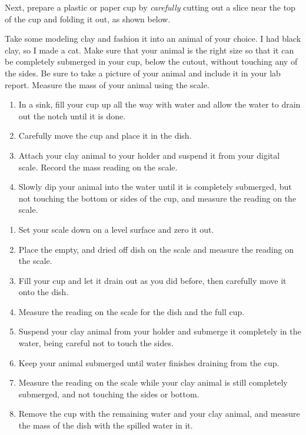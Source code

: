 
Next, prepare a plastic or paper cup by \emph{carefully} cutting out a slice near the top of the cup and folding it out, as shown below.


Take some modeling clay and fashion it into an animal of your choice. I had black clay, so I made a cat. Make sure that your animal is the right size so that it can be completely submerged in your cup, below the cutout, without touching any of the sides. Be sure to take a picture of your animal and include it in your lab report. Measure the mass of your animal using the scale.



\begin{enumerate}
        \item In a sink, fill your cup up all the way with water and allow the water to drain out the notch until it is done.
        \item Carefully move the cup and place it in the dish.
        \item Attach your clay animal to your holder and suspend it from your digital scale. Record the mass reading on the scale.
        \item Slowly dip your animal into the water until it is completely submerged, but not touching the bottom or sides of the cup, and measure the reading on the scale.

    \end{enumerate}
    
    
    \begin{enumerate}
        \item Set your scale down on a level surface and zero it out.
        \item Place the empty, and dried off dish on the scale and measure the reading on the scale.
        \item Fill your cup and let it drain out as you did before, then carefully move it onto the dish.
        \item Measure the reading on the scale for the dish and the full cup.
        \item Suspend your clay animal from your holder and submerge it completely in the water, being careful not to touch the sides.
        \item Keep your animal submerged until water finishes draining from the cup.
        \item Measure the reading on the scale while your clay animal is still completely submerged, and not touching the sides or bottom.
        \item Remove the cup with the remaining water and your clay animal, and measure the mass of the dish with the spilled water in it.
    \end{enumerate}


